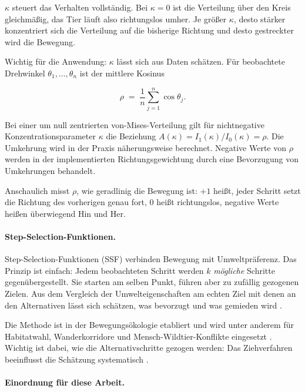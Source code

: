 \documentclass[12pt,a4paper]{report}
\begin{document}
$\kappa$ steuert das Verhalten vollständig. Bei $\kappa = 0$ ist die Verteilung über den
Kreis gleichmäßig, das Tier läuft also richtungslos umher. Je größer $\kappa$, desto stärker
konzentriert sich die Verteilung auf die bisherige Richtung und desto gestreckter wird die
Bewegung.

Wichtig für die Anwendung: $\kappa$ lässt sich aus Daten schätzen. Für beobachtete
Drehwinkel $\theta_{1},\dots,\theta_{n}$ ist der mittlere Kosinus

\begin{equation}
    \rho \;=\; \frac{1}{n}\sum_{j=1}^{n} \cos\theta_{j}.
    \label{eq:rho}
\end{equation}

Bei einer um null zentrierten von-Mises-Verteilung gilt für nichtnegative
Konzentrationsparameter $\kappa$ die Beziehung
$A(\kappa)=I_{1}(\kappa)/I_{0}(\kappa)=\rho$. Die Umkehrung wird in
der Praxis näherungsweise berechnet. Negative Werte von $\rho$ werden in
der implementierten Richtungsgewichtung durch eine Bevorzugung von Umkehrungen behandelt.

Anschaulich misst $\rho$, wie geradlinig die Bewegung ist: $+1$ heißt, jeder Schritt setzt
die Richtung des vorherigen genau fort, $0$ heißt richtungslos, negative Werte heißen
überwiegend Hin und Her.

\paragraph{Step-Selection-Funktionen.}

Step-Selection-Funktionen (SSF) verbinden Bewegung mit Umweltpräferenz. Das Prinzip ist
einfach: Jedem beobachteten Schritt werden $k$ \emph{mögliche} Schritte gegenübergestellt.
Sie starten am selben Punkt, führen aber zu zufällig gezogenen Zielen. Aus dem Vergleich
der Umwelteigenschaften am echten Ziel mit denen an den Alternativen lässt sich schätzen,
was bevorzugt und was gemieden wird \cite{Thurfjell2014}.

Die Methode ist in der Bewegungsökologie etabliert und wird unter anderem für Habitatwahl,
Wanderkorridore und Mensch-Wildtier-Konflikte eingesetzt \cite{Thurfjell2014}. Wichtig ist
dabei, wie die Alternativschritte gezogen werden: Das Ziehverfahren beeinflusst die
Schätzung systematisch \cite{Forester2009}.


\paragraph{Einordnung für diese Arbeit.}
\end{document}
